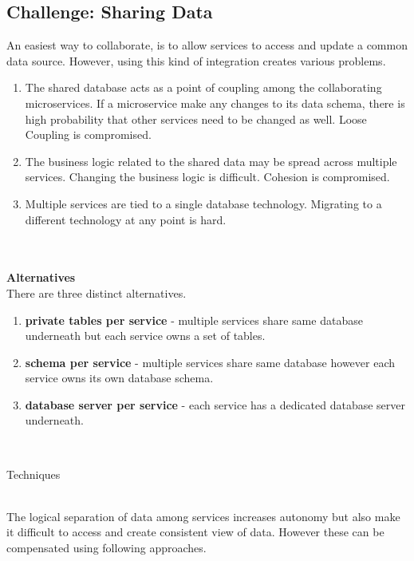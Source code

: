 \subsection{Challenge: Sharing Data}\label{section:challanges_of_microservices_architecture/integration/sharing_data}
An easiest way to collaborate, is to allow services to access and update a common data source. However, using this kind of integration creates various problems.\cite{Newman:2015aa}
\begin{enumerate}
\item The shared database acts as a point of coupling among the collaborating microservices. If a microservice make any changes to its data schema, there is high probability that other services need to be changed as well. Loose Coupling is compromised.
\item The business logic related to the shared data may be spread across multiple services. Changing the business logic is difficult. Cohesion is compromised.
\item Multiple services are tied to a single database technology. Migrating to a different technology at any point is hard.
\end{enumerate}
\\
\\
\textbf{Alternatives}\label{section:challanges_of_microservices_architecture/integration/alternatives}
\\
There are three distinct alternatives.\cite{Richardson:2015aa}
\begin{enumerate}
\item \textbf{private tables per service} - multiple services share same database underneath but each service owns a set of tables.
\item \textbf{schema per service} - multiple services share same database however each service owns its own database schema.
\item \textbf{database server per service} - each service has a dedicated database server underneath.
\end{enumerate}
\\
\begin{shaded}Techniques\end{shaded}\label{section:challanges_of_microservices_architecture/integration/sharing_data/techniques}
\\
The logical separation of data among services increases autonomy but also make it difficult to access and create consistent view of data. However these can be compensated using following approaches.\cite{Richardson:2016aa} \cite{Richardson:2015aa}
